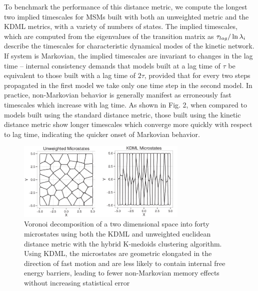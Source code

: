 \documentclass[twocolumn,floatfix,nofootinbib,aps]{revtex4-1}
\begin{document}
To benchmark the performance of this distance metric, we compute the longest two implied timescales for MSMs built with both an unweighted metric and the KDML metrics, with a variety of numbers of states. The implied timescales, which are computed from the eigenvalues of the transition matrix as $\-\tau_{lag} / \ln \lambda_i$ describe the timescales for characteristic dynamical modes of the kinetic network. If system is Markovian, the implied timescales are invariant to changes in the lag time -- internal consistency demands that models built at a lag time of $\tau$ be equivalent to those built with a lag time of  $2\tau$, provided that for every two steps propagated in the first model we take only one time step in the second model. In practice, non-Markovian behavior is generally manifest as erroneously fast timescales which increase with lag time.\cite{Schutte:2012dn} As shown in Fig. 2, when compared to models built using the standard distance metric, those built using the kinetic distance metric show longer timescales which converge more quickly with respect to lag time, indicating the quicker onset of Markovian behavior.

\begin{figure}
\centering
\includegraphics[width=3.2in]{../public/figures/toy_microstates.png}
\caption{Voronoi decomposition of a two dimensional space into forty microstates using both the KDML and unweighted euclidean distance metric with the hybrid K-medoids clustering algorithm.\cite{Beauchamp:2011he} Using KDML, the microstates are geometric elongated in the direction of fast motion and are less likely to contain internal free energy barriers, leading to fewer non-Markovian memory effects without increasing statistical error}
\end{figure}
\end{document}
